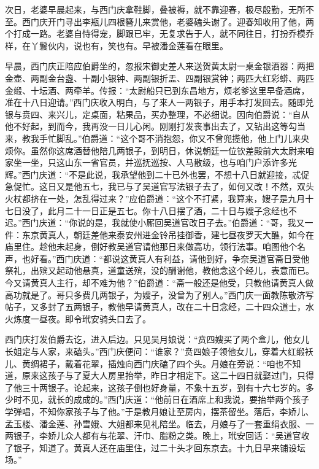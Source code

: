 次日，老婆早晨起来，与西门庆拿鞋脚，叠被褥，就不靠迎春，极尽殷勤，无所不至。西门庆开门寻出李瓶儿四根簪儿来赏他，老婆磕头谢了。迎春知收用了他，两个打成一路。老婆自恃得宠，脚跟已牢，无复求告于人，就不同往日，打扮乔模乔样，在丫鬟伙内，说也有，笑也有。早被潘金莲看在眼里。

早晨，西门庆正陪应伯爵坐的，忽报宋御史差人来送贺黄太尉一桌金银酒器：两把金壶、两副金台盏、十副小银钟、两副银折盂、四副银赏钟；两匹大红彩蟒、两匹金缎、十坛酒、两牵羊。传报：“太尉船只已到东昌地方，烦老爹这里早备酒席，准在十八日迎请。”西门庆收入明白，与了来人一两银子，用手本打发回去。随即兑银与贲四、来兴儿，定桌面，粘果品，买办整理，不必细说。因向伯爵说：“自从他不好起，到而今，我再没一日儿心闲。刚刚打发丧事出去了，又钻出这等勾当来，教我手忙脚乱。”伯爵道：“这个哥不消抱怨，你又不曾兜揽他，他上门儿来央烦你。虽然你这席酒替他陪几两银子，到明日，休说朝廷一位钦差殿前大太尉来咱家坐一坐，只这山东一省官员，并巡抚巡按、人马散级，也与咱门户添许多光辉。”西门庆道：“不是此说，我承望他到二十已外也罢，不想十八日就迎接，忒促急促忙。这日又是他五七，我已与了吴道官写法银子去了，如何又改！不然，双头火杖都挤在一处，怎乱得过来？”应伯爵道：“这个不打紧，我算来，嫂子是九月十七日没了，此月二十一日正是五七。你十八日摆了酒，二十日与嫂子念经也不迟。”西门庆道：“你说的是，我就使小厮回吴道官改日子去。”伯爵道：“哥，我又一件：东京黄真人，朝廷差他来泰安州进金铃吊挂御香，建七昼夜罗天大醮，如今在庙里住。趁他未起身，倒好教吴道官请他那日来做高功，领行法事。咱图他个名声，也好看。”西门庆道：“都说这黄真人有利益，请他到好，争奈吴道官斋日受他祭礼，出殡又起动他悬真，道童送殡，没的酬谢他，教他念这个经儿，表意而已。今又请黄真人主行，却不难为他？”伯爵道：“斋一般还是他受，只教他请黄真人做高功就是了。哥只多费几两银子，为嫂子，没曾为了别人。”西门庆一面教陈敬济写帖子，又多封了五两银子，教他早请黄真人，改在二十日念经，二十四众道士，水火炼度一昼夜。即令玳安骑头口去了。

西门庆打发伯爵去讫，进入后边。只见吴月娘说：“贲四嫂买了两个盒儿，他女儿长姐定与人家，来磕头。”西门庆便问：“谁家？”贲四娘子领他女儿，穿着大红缎袄儿、黄绸裙子，戴着花翠，插烛向西门庆磕了四个头。月娘在旁说：“咱也不知道，原来这孩子与了夏大人房里抬举，昨日才相定下。这二十四日就娶过门，只得了他三十两银子。论起来，这孩子倒也好身量，不象十五岁，到有十六七岁的。多少时不见，就长的成成的。”西门庆道：“他前日在酒席上和我说，要抬举两个孩子学弹唱，不知你家孩子与了他。”于是教月娘让至房内，摆茶留坐。落后，李娇儿、孟玉楼、潘金莲、孙雪娥、大姐都来见礼陪坐。临去，月娘与了一套重绢衣服、一两银子，李娇儿众人都有与花翠、汗巾、脂粉之类。晚上，玳安回话：“吴道官收了银子，知道了。黄真人还在庙里住，过二十头才回东京去。十九日早来铺设坛场。”

